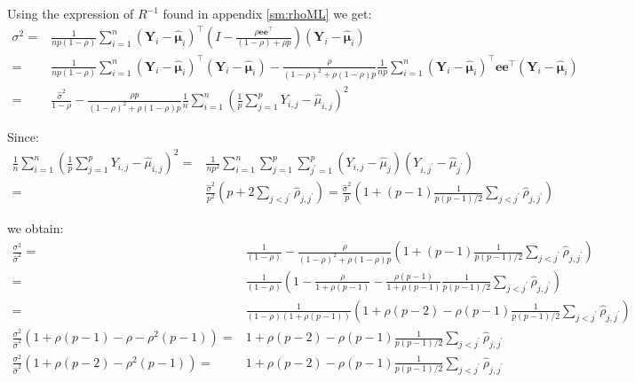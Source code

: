 \documentclass[12pt]{article}
\newcommand\Ve{\mathbf{e}}
\newcommand\VY{\mathbf{Y}}
\newcommand\Vmu{\boldsymbol{\mu}}
\newcommand\trans[1]{{#1}^\intercal}%
\begin{document}
Using the expression of \(R^{-1}\) found in appendix \ref{sm:rhoML} we get:
\begin{align*}
\sigma^2 =& \frac{1}{n p (1- \rho)} \sum_{i=1}^n \trans{(\VY_i-\widehat{\Vmu}_i)} \left(I - \frac{\rho \Ve\trans{\Ve}}{(1-\rho)+\rho p} \right) (\VY_i-\widehat{\Vmu}_i)  \\
 =& \frac{1}{n p (1- \rho)} \sum_{i=1}^n \trans{(\VY_i-\widehat{\Vmu}_i)}(\VY_i-\widehat{\Vmu}_i)  - \frac{\rho}{(1-\rho)^2+\rho(1-\rho) p} \frac{1}{np} \sum_{i=1}^n \trans{(\VY_i-\widehat{\Vmu}_i)} \Ve\trans{\Ve} (\VY_i-\widehat{\Vmu}_i)  \\
 =& \frac{\widehat{\sigma}^2}{1- \rho}  - \frac{\rho p}{(1-\rho)^2+\rho(1-\rho) p} \frac{1}{n} \sum_{i=1}^n \left(\frac{1}{p}\sum_{j=1}^p Y_{i,j}-\widehat{\mu}_{i,j}\right)^2
\end{align*}

Since:
\begin{align*}
\frac{1}{n} \sum_{i=1}^n \left(\frac{1}{p}\sum_{j=1}^p Y_{i,j}-\widehat{\mu}_{i,j}\right)^2=& \frac{1}{np^2} \sum_{i=1}^n \sum_{j=1}^p \sum_{j^{\prime}=1}^p \left(Y_{i,j}-\widehat{\mu}_j\right)\left(Y_{i,j^{\prime}}-\widehat{\mu}_{j^{\prime}}\right) \\
=&  \frac{\widehat{\sigma}^2}{p^2} \left(p + 2\sum_{j < j^{\prime}}\widehat{\rho}_{j,j^{\prime}}\right)  = \frac{\widehat{\sigma}^2}{p} \left(1 + (p-1)\frac{1}{p(p-1)/2}\sum_{j < j^{\prime}}\widehat{\rho}_{j,j^{\prime}}\right) 
\end{align*}

we obtain:
\begin{align*}
\frac{\sigma^2}{\widehat{\sigma}^2} =& \frac{1}{(1- \rho)}  - \frac{\rho}{(1-\rho)^2+\rho(1-\rho)p} \left(1 + (p-1)\frac{1}{p(p-1)/2}\sum_{j < j^{\prime}}\widehat{\rho}_{j,j^{\prime}}\right) \\
                                    =&  \frac{1}{(1- \rho)}\left(1  - \frac{\rho}{1+\rho(p-1)} - \frac{\rho(p-1)}{1+\rho(p-1)}\frac{1}{p(p-1)/2}\sum_{j < j^{\prime}}\widehat{\rho}_{j,j^{\prime}}\right) \\
                                    =&  \frac{1}{(1- \rho)(1+\rho(p-1))}\left(1 + \rho (p-2) - \rho(p-1)\frac{1}{p(p-1)/2}\sum_{j < j^{\prime}}\widehat{\rho}_{j,j^{\prime}}\right) \\
\frac{\sigma^2}{\widehat{\sigma}^2} (1+\rho(p-1)-\rho-\rho^2(p-1)) =& 1 + \rho (p-2) - \rho(p-1)\frac{1}{p(p-1)/2}\sum_{j < j^{\prime}}\widehat{\rho}_{j,j^{\prime}} \\                                   
\frac{\sigma^2}{\widehat{\sigma}^2} (1+\rho(p-2)-\rho^2(p-1)) =& 1 + \rho (p-2) - \rho(p-1)\frac{1}{p(p-1)/2}\sum_{j < j^{\prime}}\widehat{\rho}_{j,j^{\prime}}                                   
\end{align*}
\end{document}
